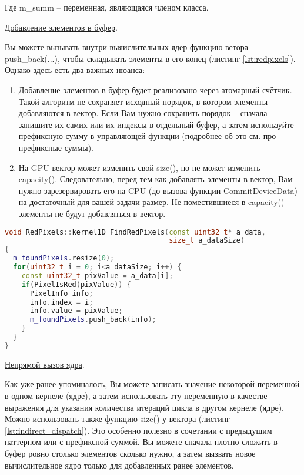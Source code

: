 \documentclass[11pt,fleqn,english,russian]{report} %
\begin{document}
Где m\_summ -- переменная, являющаяся членом класса.

\noindent\underline{Добавление элементов в буфер}.

Вы можете вызывать внутри выяислительных ядер функцию ветора push\_back(...), чтобы складывать элементы в его конец (листинг \ref{lst:redpixels}). Однако здесь есть два важных нюанса:

\begin{enumerate}
\item Добавление элементов в буфер будет реализовано через атомарный счётчик. Такой алгоритм не сохраняет исходный порядок, в котором элементы добавляются в вектор. Если Вам нужно сохранить порядок -- сначала запишите их самих или их индексы в отдельный буфер, а затем используйте префиксную сумму в управляющей функции (подробнее об это см. про префиксные суммы).
\item На GPU вектор может изменить свой size(), но не может изменить capacity(). Следовательно, перед тем как добавлять элементы в вектор, Вам нужно зарезервировать его на CPU (до вызова функции CommitDeviceData) на достаточный для вашей задачи размер. Не поместившиеся в capacity() элементы не будут добавляться в вектор.
\end{enumerate}

\begin{lstlisting}[language=C++, 
	               caption=добавление элементов в конец буфера, 
	               label=lst:redpixels]	
void RedPixels::kernel1D_FindRedPixels(const uint32_t* a_data, 
                                       size_t a_dataSize)
{
  m_foundPixels.resize(0);
  for(uint32_t i = 0; i<a_dataSize; i++) {
    const uint32_t pixValue = a_data[i];
    if(PixelIsRed(pixValue)) {
      PixelInfo info;
      info.index = i;
      info.value = pixValue;
      m_foundPixels.push_back(info);
    }
  }
}
\end{lstlisting}

\noindent\underline{Непрямой вызов ядра}.

Как уже ранее упоминалось, Вы можете записать значение некоторой переменной в одном кернеле (ядре), а затем использовать эту переменную в качестве выражения для указания количества итераций цикла в другом кернеле (ядре). Можно использовать также функцию size() у вектора (листинг \ref{lst:indirect_dispatch}). Это особенно полезно в сочетании с предыдущим паттерном или с префиксной суммой. Вы можете сначала плотно сложить в буфер ровно столько элементов сколько нужно, а затем вызвать новое вычислительное ядро только для добавленных ранее элементов.
\end{document}

